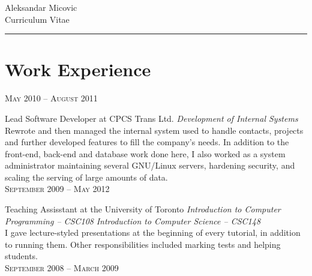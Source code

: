 \documentclass[10pt]{article}
\begin{document}
\color{text1}
    \par{\centering
            {\sffamily\Huge Aleksandar Micovic}\\	
            {\color{headings} 
                {\LARGE Curriculum Vitae}
            }
        \\[20pt]\par}
    {\color{white} \hrule}

	
\begin{minipage}[t]{0.5\textwidth}
    \vspace{0pt}
	
\section{Work Experience}
    \raggedleft
    \textsc{\normalsize May 2010 -- August 2011}\par

    \raggedright\large Lead Software Developer at CPCS Trans Ltd.
    \emph{Development of Internal Systems}\\[5pt]

    \normalsize{Rewrote and then managed the  internal system used to handle
    contacts, projects and further developed features to fill the company's
    needs. In addition to the front-end, back-end and database work done here,
    I also worked as a system administrator maintaining several GNU/Linux 
    servers, hardening security, and scaling the serving of large amounts of data.}\\[10pt]

    \raggedleft
    \textsc{\normalsize September 2009 -- May 2012}\par

    \raggedright\large Teaching Assisstant at the University of Toronto
    \emph{Introduction to Computer Programming -- CSC108}
    \emph{Introduction to Computer Science -- CSC148}\\[5pt]

    \normalsize{I gave lecture-styled presentations at the beginning of every 
    tutorial, in addition to running them. Other responsibilities included
    marking tests and helping students.}\\[10pt]

    \raggedleft
    \textsc{\normalsize September 2008 -- March 2009}\par


\end{minipage}
\end{document}
